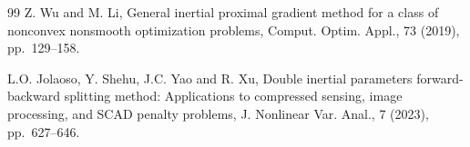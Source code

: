 \documentclass{article}
\theoremstyle{definition}
\theoremstyle{definition}
\theoremstyle{definition}
\begin{document}
\begin{thebibliography}{99}
 Z. Wu and M. Li, General inertial proximal gradient method for a class of nonconvex nonsmooth optimization problems, Comput. Optim. Appl., 73 (2019), pp.~129--158.

 L.O. Jolaoso, Y. Shehu, J.C. Yao and R. Xu, Double inertial parameters forward-backward splitting method: Applications to compressed sensing, image processing, and SCAD penalty problems, J. Nonlinear Var. Anal., 7 (2023), pp.~627--646.

\end{thebibliography}
\end{document}
